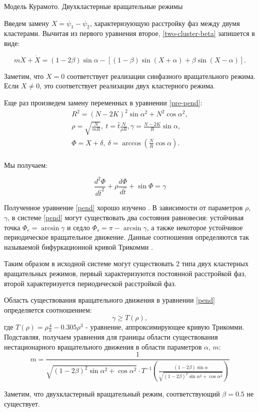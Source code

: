\begin{chapter}{Модель Курамото. Двухкластерные вращательные режимы}
	
	Введем замену $X = \psi_1 - \psi_2$, характеризующую расстройку фаз между двумя кластерами.
	Вычитая из первого уравнения второе, \ref{two-cluster-beta} запишется в виде:
	
	\begin{equation} \label{pre-pend}
		m\ddot{X} + \dot{X} = (1 - 2 \beta) \sin{\alpha} - \left[(1-\beta)\sin{(X + \alpha)} + \beta\sin{(X - \alpha)} \right].
	\end{equation}
	
	Заметим, что $X = 0$ соответствует реализации
	синфазного вращательного режима. Если $X \neq 0$,
	это соответствует реализации двух кластерного режима. 
	
	Еще раз произведем замену переменных в уравнении \ref{pre-pend}:
	\begin{align*}
	R^2 = (N - 2K)^2 \sin{\alpha}^2 + N^2 \cos{\alpha}^2, \\
	\rho = \sqrt{\frac{N}{m R}}, \ t = \hat{t} \frac{N}{\rho R}, \gamma = \frac{N - 2K}{R}\sin{\alpha}, \\
	\Phi = X + \delta, \ \delta = \arccos{(\frac{N}{R}\cos{\alpha})}. \\
	\end{align*}
	
	Мы получаем:
	
	\begin{equation} \label{pend}
		\frac{d^2 \Phi }{d\hat{t}^2} + \rho \frac{d\Phi}{d\hat{t}} + \sin{\Phi} = \gamma
	\end{equation}

	Полученное уравнение \ref{pend} хорошо изучено \cite{Andronov:Vitt}. 
	В зависимости от параметров $\rho$, $\gamma$, в системе \ref{pend}
	могут существовать два состояния равновесия:
	устойчивая точка $\Phi_e = \arcsin{\gamma}$ и седло
	$\Phi_s = \pi - \arcsin{\gamma}$, а также
	некоторое устойчивое периодическое вращательное движение.
	Данные соотношения определяются так называемой
	бифуркационной кривой Трикомми \cite{Andronov:Vitt}.

	Таким образом в исходной системе могут существовать 2 типа
	двух кластерных вращательных режимов, первый характеризуются
	постоянной расстройкой фаз, второй характеризуется
	периодической расстройкой фаз.
	
	Область существования вращательного движения в уравнении \ref{pend}
	определяется соотношением:
	\begin{equation}
		\gamma \ge T(\rho),
	\end{equation}
	где $T(\rho) = \rho\frac{4}{\pi} - 0.305\rho^3$ - уравнение, аппроксимирующее кривую Трикомми.
	Подставляя, получаем уравнения для границы области существования нестационарного вращательного движения в области параметров
	$\alpha$, $m$:
	\begin{equation} \label{borders}
		m = \frac{1}{\sqrt{(1 - 2\beta)^2\sin{\alpha}^2 + \cos{\alpha}^2} \cdot T^{-1}(\frac{(1 - 2\beta)\sin{\alpha}}{\sqrt{(1 - 2\beta)^2\sin{\alpha}^2 + \cos{\alpha}^2}})}
	\end{equation}


	Заметим, что двухкластерный вращательный режим, соответствующий
	$\beta = 0.5$ не существует.


\end{chapter}